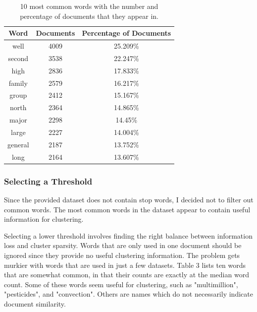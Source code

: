 \documentclass{article} %
\begin{document}
\begin{table}[!htb]
\caption{10 most common words with the number and percentage of documents that they appear in.}
\label{most-common-words-table}
\begin{center}
    \begin{tabular}{ | c | c | c |}
    \hline
    \textbf{Word} & \textbf{Documents} & \textbf{Percentage of Documents} \\ \hline

well & 4009 & 25.209\% \\ \hline 
second & 3538 & 22.247\% \\ \hline 
high & 2836 & 17.833\% \\ \hline 
family & 2579 & 16.217\% \\ \hline 
group & 2412 & 15.167\% \\ \hline 
north & 2364 & 14.865\% \\ \hline 
major & 2298 & 14.45\% \\ \hline 
large & 2227 & 14.004\% \\ \hline 
general & 2187 & 13.752\% \\ \hline 
long & 2164 & 13.607\% \\ \hline 

\end{tabular}
\end{center}
\end{table}



\subsubsection{Selecting a Threshold}

Since the provided dataset does not contain stop words, I decided not to filter out common words. The most common words in the dataset appear to contain useful information for clustering. 

Selecting a lower threshold involves finding the right balance between information loss and cluster sparsity. Words that are only used in one document should be ignored since they provide no useful clustering information. The problem gets murkier with words that are used in just a few datasets. Table 3 lists ten words that are somewhat common, in that their counts are exactly at the median word count. Some of these words seem useful for clustering, such as "multimillion", "pesticides", and "convection". Others are names which do not necessarily indicate document similarity. 
\end{document}
